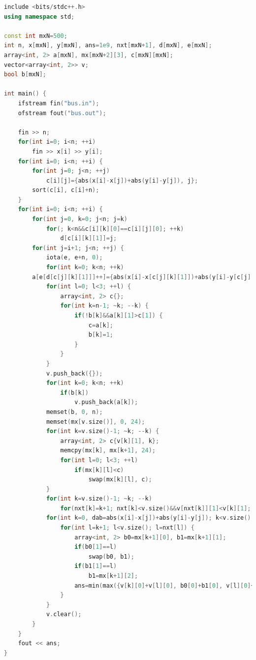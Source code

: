 \documentclass[12pt,twiside,a4paper]{ctexbook}
\numberwithin{chapter}{part}
\begin{document}
\begin{lstlisting}[language=c++,breaklines=true] 
include <bits/stdc++.h>
using namespace std;

const int mxN=500;
int n, x[mxN], y[mxN], ans=1e9, nxt[mxN+1], d[mxN], e[mxN];
array<int, 2> a[mxN], mx[mxN+2][3], c[mxN][mxN];
vector<array<int, 2>> v;
bool b[mxN];

int main() {
    ifstream fin("bus.in");
    ofstream fout("bus.out");

    fin >> n;
    for(int i=0; i<n; ++i)
        fin >> x[i] >> y[i];
    for(int i=0; i<n; ++i) {
        for(int j=0; j<n; ++j)
            c[i][j]={abs(x[i]-x[j])+abs(y[i]-y[j]), j};
        sort(c[i], c[i]+n);
    }
    for(int i=0; i<n; ++i) {
        for(int j=0, k=0; j<n; j=k)
            for(; k<n&&c[i][k][0]==c[i][j][0]; ++k)
                d[c[i][k][1]]=j;
        for(int j=i+1; j<n; ++j) {
            iota(e, e+n, 0);
            for(int k=0; k<n; ++k)
		a[e[d[c[j][k][1]]]++]={abs(x[i]-x[c[j][k][1]])+abs(y[i]-y[c[j][k][1]]), c[j][k][0]};
            for(int l=0; l<3; ++l) {
                array<int, 2> c{};
                for(int k=n-1; ~k; --k) {
                    if(!b[k]&&a[k][1]>c[1]) {
                        c=a[k];
                        b[k]=1;
                    }
                }
            }
            v.push_back({});
            for(int k=0; k<n; ++k)
                if(b[k])
                    v.push_back(a[k]);
            memset(b, 0, n);
            memset(mx[v.size()], 0, 24);
            for(int k=v.size()-1; ~k; --k) {
                array<int, 2> c{v[k][1], k};
                memcpy(mx[k], mx[k+1], 24);
                for(int l=0; l<3; ++l)
                    if(mx[k][l]<c)
                        swap(mx[k][l], c);
            }
            for(int k=v.size()-1; ~k; --k)
                for(nxt[k]=k+1; nxt[k]<v.size()&&v[nxt[k]][1]<v[k][1]; nxt[k]=nxt[nxt[k]]);
            for(int k=0, dab=abs(x[i]-x[j])+abs(y[i]-y[j]); k<v.size(); ++k) {
                for(int l=k+1; l<v.size(); l=nxt[l]) {
                    array<int, 2> b0=mx[k+1][0], b1=mx[k+1][1];
                    if(b0[1]==l)
                        swap(b0, b1);
                    if(b1[1]==l)
                        b1=mx[k+1][2];
                    ans=min(max({v[k][0]+v[l][0], b0[0]+b1[0], v[l][0]+dab+b0[0]}), ans);
                }
            }
            v.clear();
        }
    }
    fout << ans;
}
\end{lstlisting}
\end{document}
